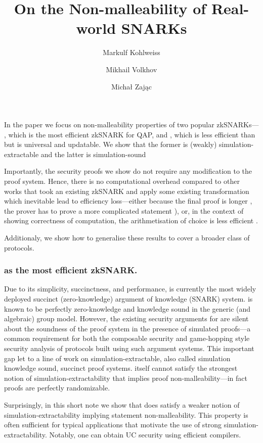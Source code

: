 \documentclass[runningheads,11pt]{llncs}
\title{On the Non-malleability of Real-world SNARKs}
\author{Markulf Kohlweiss\inst{1,2} \and Mikhail Volkhov\inst{1} \and Michał Zając\inst{3}}
\institute{University of Edinburgh, Edinburgh, UK \and IOHK \\ \email{mkohlwei@inf.ed.ac.uk}, \email{mikhail.volkhov@ed.ac.uk} \and Clearmatics, London UK \\ \email{m.p.zajac@gmail.com}}
\begin{document}
	\maketitle
	
	In the paper we focus on non-malleability properties of two popular zkSNARKs---\groth{}  \cite{EC:Groth16}, which is the most efficient zkSNARK for QAP, and \plonk{} \cite{EPRINT:GabWilCio19}, which is less efficient than \groth{} but is universal and updatable.
	We show that the former is (weakly) simulation-extractable and the latter is simulation-sound
	
	Importantly, the security proofs we show do not require any modification to the proof system. 
	Hence, there is no computational overhead compared to other works that took an existing zkSNARK and apply some existing transformation which inevitable lead to efficiency loss---either because the final proof is longer \cite{EPRINT:BowGab18}, the prover has to prove a more complicated statement \cite{ASIACCS:DerSla18,EPRINT:AbdRamSla20}), or, in the context of showing correctness of computation, the arithmetisation of choice is less efficient \cite{C:GroMal17}.	
	
	Additionaly, we show how to generalise these results to cover a broader class of protocols.  
	
	\subsubsection*{\groth{} as the most efficient zkSNARK.}
	Due to its simplicity, succinctness, and performance, \groth{} is
  currently the most widely deployed succinct (zero-knowledge) argument of
  knowledge (SNARK) system. \groth{} is known to be perfectly zero-knowledge and knowledge sound in the generic (and algebraic) group model. However, the existing security arguments for \groth{} are silent about the soundness of the proof system in the presence of simulated proofs---a common requirement for both the composable security and game-hopping style security analysis of protocols built using such argument systems. This important gap let to a line of work on simulation-extractable, also called simulation knowledge sound, succinct proof systems. \groth{} itself cannot satisfy the strongest
  notion of simulation-extractability that implies proof
  non-malleability---in fact proofs are perfectly randomizable.

  Surprisingly, in this short note we show that \groth{} does satisfy a
  weaker notion of simulation-extractability implying statement
  non-malleability. This property is often sufficient for typical
  applications that motivate the use of strong
  simulation-extractability. Notably, one can obtain UC security using
  efficient compilers.
	
\end{document}

